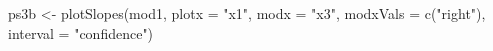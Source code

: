 \begin{Schunk}
\begin{Sinput}
 ps3b <- plotSlopes(mod1, plotx = "x1", modx = "x3", modxVals = c("right"), interval = "confidence")
\end{Sinput}
\end{Schunk}
